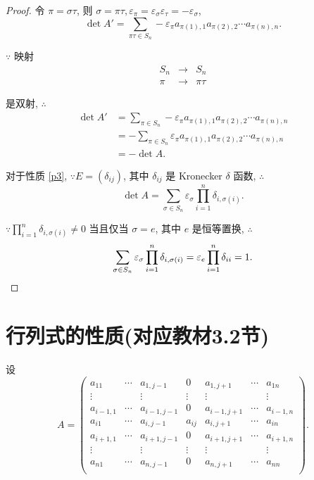 \documentclass{ctexart}
\begin{document}
\begin{proof}
    令 $\pi=\sigma\tau$, 则 $\sigma=\pi\tau,\varepsilon_\pi=\varepsilon_\sigma\varepsilon_\tau=-\varepsilon_\sigma$,
    \[\det A'=\sum\limits_{\pi\tau\in S_n}-\varepsilon_\pi a_{\pi(1),1}a_{\pi(2),2}\cdots a_{\pi(n),n}.\]

    $\because$ 映射
    \[\begin{array}{rcl}
        S_n & \to & S_n \\
        \pi & \to & \pi\tau
    \end{array}\]

    是双射, $\therefore$
    \begin{align*}
        \det A' & =\sum\limits_{\pi\in S_n}-\varepsilon_\pi a_{\pi(1),1}a_{\pi(2),2}\cdots a_{\pi(n),n} \\
        & =-\sum\limits_{\pi\in S_n}\varepsilon_\pi a_{\pi(1),1}a_{\pi(2),2}\cdots a_{\pi(n),n} \\
        & =-\det A.
    \end{align*}

    对于性质 \ref{p3}, $\because E=(\delta_{ij})$, 其中 $\delta_{ij}$ 是 Kronecker $\delta$ 函数, $\therefore$
    \[\det A=\sum\limits_{\sigma\in S_n}\varepsilon_\sigma\prod\limits_{i=1}^n\delta_{i,\sigma(i)}.\]

    $\because\prod\limits_{i=1}^n\delta_{i,\sigma(i)}\neq0$ 当且仅当 $\sigma=e$, 其中 $e$ 是恒等置换, $\therefore$
    \[\sum\limits_{\sigma\in S_n}\varepsilon_\sigma\prod\limits_{i=1}^n\delta_{i,\sigma(i)}=\varepsilon_e\prod\limits_{i=1}^n\delta_{ii}=1.\qedhere\]
\end{proof}
\section{行列式的性质(对应教材3.2节)}
设
\[A=\begin{pmatrix}
    a_{11} & \cdots & a_{1,j-1} & 0 & a_{1,j+1} & \cdots & a_{1n} \\
    \vdots && \vdots & \vdots & \vdots && \vdots \\
    a_{i-1,1} & \cdots & a_{i-1,j-1} & 0 & a_{i-1,j+1} & \cdots & a_{i-1,n} \\
    a_{i1} & \cdots & a_{i,j-1} & a_{ij} & a_{i,j+1} & \cdots & a_{in} \\
    a_{i+1,1} & \cdots & a_{i+1,j-1} & 0 & a_{i+1,j+1} & \cdots & a_{i+1,n} \\
    \vdots && \vdots & \vdots & \vdots && \vdots \\
    a_{n1} & \cdots & a_{n,j-1} & 0 & a_{n,j+1} & \cdots & a_{nn} \\
\end{pmatrix}.\]
\end{document}
